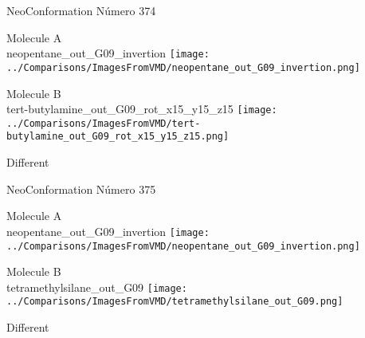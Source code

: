  \newpage

\vtab[-3cm]
\begin{center}
{\large NeoConformation \tab Número 374}
\end{center}
\begin{multicols}{2}
\begin{center}
Molecule A \\ 
neopentane\_out\_G09\_invertion
\texttt{[image: ../Comparisons/ImagesFromVMD/neopentane\_out\_G09\_invertion.png]}
\\
\vtab

\columnbreak
Molecule B \\ 
tert-butylamine\_out\_G09\_rot\_x15\_y15\_z15
\texttt{[image: ../Comparisons/ImagesFromVMD/tert-butylamine\_out\_G09\_rot\_x15\_y15\_z15.png]}
\\
\vtab


\end{center}
\end{multicols}
\begin{center}
\textcolor{NavyBlue}{\Large Different}
\end{center}

 \newpage

\vtab[-3cm]
\begin{center}
{\large NeoConformation \tab Número 375}
\end{center}
\begin{multicols}{2}
\begin{center}
Molecule A \\ 
neopentane\_out\_G09\_invertion
\texttt{[image: ../Comparisons/ImagesFromVMD/neopentane\_out\_G09\_invertion.png]}
\\
\vtab

\columnbreak
Molecule B \\ 
tetramethylsilane\_out\_G09
\texttt{[image: ../Comparisons/ImagesFromVMD/tetramethylsilane\_out\_G09.png]}
\\
\vtab


\end{center}
\end{multicols}
\begin{center}
\textcolor{NavyBlue}{\Large Different}
\end{center}

 \newpage

